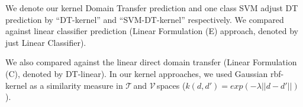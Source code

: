 We denote our kernel Domain Transfer prediction  and one class SVM adjust DT prediction by  ``DT-kernel'' and ``SVM-DT-kernel'' respectively. We compared against  linear classifier prediction (Linear Formulation (E) approach, denoted by just Linear Classifier).  We also compared against the  linear direct domain transfer (Linear Formulation (C), denoted by DT-linear).  In our kernel approaches, we used Gaussian rbf-kernel as a similarity measure in \small$\mathcal{T}\,$\normalsize and \small$\mathcal{V}\,$\normalsize spaces (\ie \small$k(d,d') = exp(-\lambda ||d-d'||)$\normalsize). 

 
